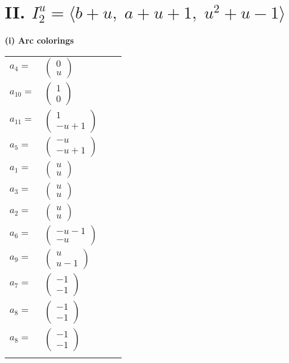\documentclass[1p]{elsarticle_modified}
\theoremstyle{definition}
\begin{document}
\centering \section*{II. $I^u_{2}= \langle b+u,\;a+u+1,\;u^2+u-1 \rangle$}
\flushleft \textbf{(i) Arc colorings}\\
\begin{tabular}{m{7pt} m{180pt} m{7pt} m{180pt} }
\flushright $a_{4}=$&$\begin{pmatrix}0\\u\end{pmatrix}$ \\
\flushright $a_{10}=$&$\begin{pmatrix}1\\0\end{pmatrix}$ \\
\flushright $a_{11}=$&$\begin{pmatrix}1\\- u+1\end{pmatrix}$ \\
\flushright $a_{5}=$&$\begin{pmatrix}- u\\- u+1\end{pmatrix}$ \\
\flushright $a_{1}=$&$\begin{pmatrix}u\\u\end{pmatrix}$ \\
\flushright $a_{3}=$&$\begin{pmatrix}u\\u\end{pmatrix}$ \\
\flushright $a_{2}=$&$\begin{pmatrix}u\\u\end{pmatrix}$ \\
\flushright $a_{6}=$&$\begin{pmatrix}- u-1\\- u\end{pmatrix}$ \\
\flushright $a_{9}=$&$\begin{pmatrix}u\\u-1\end{pmatrix}$ \\
\flushright $a_{7}=$&$\begin{pmatrix}-1\\-1\end{pmatrix}$ \\
\flushright $a_{8}=$&$\begin{pmatrix}-1\\-1\end{pmatrix}$\\ \flushright $a_{8}=$&$\begin{pmatrix}-1\\-1\end{pmatrix}$\\&\end{tabular}
\end{document}
